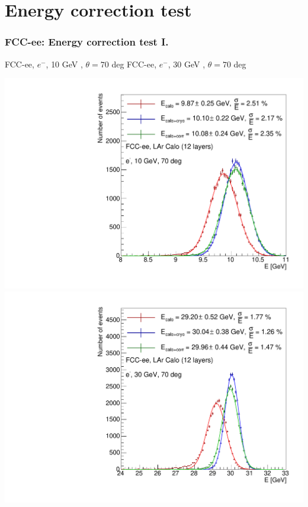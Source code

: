 \documentclass[aspectratio=169]{beamer}
\newcommand{\redtext}[1]{%
  \textcolor{myRed}{#1}
}
\begin{document}
\section{Energy correction test}

\begin{frame}
  \frametitle{FCC-ee: Energy correction test I.}

  \centering
  FCC-ee, $e^{-}$, \redtext{10 GeV}, $\theta = 70$ deg \hspace{8mm}
  FCC-ee, $e^{-}$, \redtext{30 GeV}, $\theta = 70$ deg \\[1.5ex]
  \begin{adjustwidth}{-5mm}{-5mm}
    \includegraphics[width=0.49\linewidth]{figures/2d/hist_energy_corr_test_70deg_10GeV.pdf}
    \includegraphics[width=0.49\linewidth]{figures/2d/hist_energy_corr_test_70deg_30GeV.pdf}
  \end{adjustwidth}
\end{frame}
\end{document}
